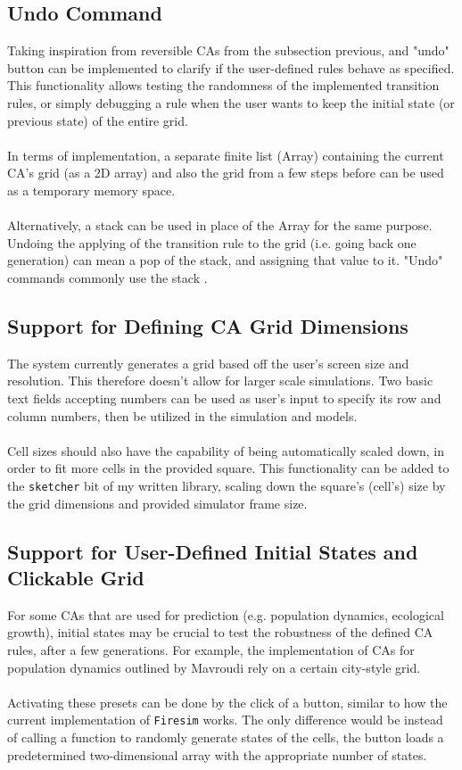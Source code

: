 \subsection{Undo Command}
Taking inspiration from reversible CAs from the subsection previous, and "undo" button can be implemented to clarify if the user-defined rules behave as specified. This functionality allows testing the randomness of the implemented transition rules, or simply debugging a rule when the user wants to keep the initial state (or previous state) of the entire grid. 
\\ \\
In terms of implementation, a separate finite list (Array) containing the current CA's grid (as a 2D array) and also the grid from a few steps before can be used as a temporary memory space. \\ \\
Alternatively, a stack can be used in place of the Array for the same purpose. Undoing the applying of the transition rule to the grid (i.e. going back one generation) can mean a pop of the stack, and assigning that value to it. "Undo" commands commonly use the stack \cite{karimov2020stacks}. 

\subsection{Support for Defining CA Grid Dimensions}
The system currently generates a grid based off the user's screen size and resolution. This therefore doesn't allow for larger scale simulations. Two basic text fields accepting numbers can be used as user's input to specify its row and column numbers, then be utilized in the simulation and models. 
\\ \\
Cell sizes should also have the capability of being automatically scaled down, in order to fit more cells in the provided square. This functionality can be added to the \texttt{sketcher} bit of my written library, scaling down the square's (cell's) size by the grid dimensions and provided simulator frame size. 

\subsection{Support for User-Defined Initial States and Clickable Grid}
For some CAs that are used for prediction (e.g. population dynamics, ecological growth), initial states may be crucial to test the robustness of the defined CA rules, after a few generations. For example, the implementation of CAs for population dynamics outlined by Mavroudi \cite{mavroudi} rely on a certain city-style grid. 
\\ \\
Activating these presets can be done by the click of a button, similar to how the current implementation of \texttt{Firesim} works. The only difference would be instead of calling a function to randomly generate states of the cells, the button loads a predetermined two-dimensional array with the appropriate number of states. 

